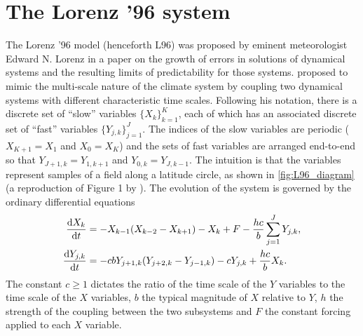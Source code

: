 \documentclass[../main.tex]{subfiles}
\begin{document}
\section{The Lorenz '96 system}
The Lorenz '96 model (henceforth L96) was proposed by eminent meteorologist
Edward N. Lorenz in a \citeyear{lorenz1995} paper \parencite{lorenz1995} on the
growth of errors in solutions of dynamical systems and the resulting limits of
predictability for those systems. \citeauthor{lorenz1995} proposed to mimic the
multi-scale nature of the climate system by coupling two dynamical systems with
different characteristic time scales. Following his notation, there is a
discrete set of ``slow'' variables $\{X_k\}_{k=1}^K$, each of which has an
associated discrete set of ``fast'' variables $\{Y_{j,k}\}_{j=1}^J$. The
indices of the slow variables are periodic ($X_{K+1} = X_1$ and $X_0 = X_K$)
and the sets of fast variables are arranged end-to-end so that $Y_{J+1,k} =
Y_{1,k+1}$ and $Y_{0,k} = Y_{J,k-1}$. The intuition is that the variables
represent samples of a field along a latitude circle, as shown in
\cref{fig:L96_diagram} (a reproduction of Figure 1 by \textcite{russell2017}).
The evolution of the system is governed by the ordinary differential equations
\begin{subequations} \label{eqn:l96}
\begin{align}
    \frac{\mathrm{d} X_k}{\mathrm{d} t}
        &= -X_{k-1} (X_{k-2} - X_{k+1}) - X_k + F
        - \frac{hc}{b} \sum_{j=1}^J Y_{j,k}, \\
    \frac{\mathrm{d} Y_{j,k}}{\mathrm{d} t}
        &= -cb Y_{j+1,k} (Y_{j+2,k} - Y_{j-1,k}) - c Y_{j,k}
        + \frac{hc}{b} X_k.
\end{align}
\end{subequations}
The constant $c \geq 1$ dictates the ratio of the time scale of the $Y$
variables to the time scale of the $X$ variables, $b$ the typical magnitude of
$X$ relative to $Y$, $h$ the strength of the coupling between the two
subsystems and $F$ the constant forcing applied to each $X$ variable.
\end{document}
